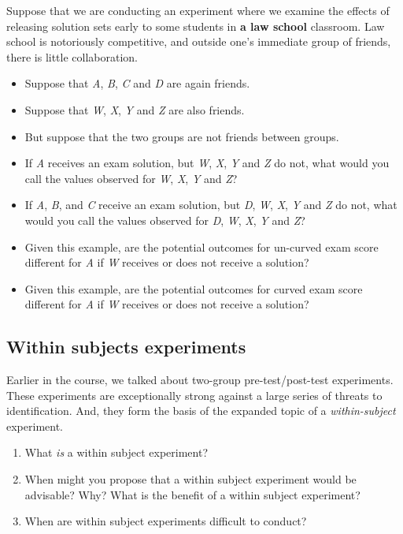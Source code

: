 \documentclass[
]{article}
\providecommand{\tightlist}{%
  \setlength{\itemsep}{0pt}\setlength{\parskip}{0pt}}
\begin{document}
Suppose that we are conducting an experiment where we examine the effects of releasing solution sets early to some students in \textbf{a law school} classroom. Law school is notoriously competitive, and outside one's immediate group of friends, there is little collaboration.

\begin{itemize}
\item
  Suppose that \emph{A}, \emph{B}, \emph{C} and \emph{D} are again friends.
\item
  Suppose that \emph{W}, \emph{X}, \emph{Y} and \emph{Z} are also friends.
\item
  But suppose that the two groups are not friends between groups.
\item
  If \emph{A} receives an exam solution, but \emph{W}, \emph{X}, \emph{Y} and \emph{Z} do not, what would you call the values observed for \emph{W}, \emph{X}, \emph{Y} and \emph{Z}?
\item
  If \emph{A}, \emph{B}, and \emph{C} receive an exam solution, but \emph{D}, \emph{W}, \emph{X}, \emph{Y} and \emph{Z} do not, what would you call the values observed for \emph{D}, \emph{W}, \emph{X}, \emph{Y} and \emph{Z}?
\item
  Given this example, are the potential outcomes for un-curved exam score different for \emph{A} if \emph{W} receives or does not receive a solution?
\item
  Given this example, are the potential outcomes for curved exam score different for \emph{A} if \emph{W} receives or does not receive a solution?
\end{itemize}

\hypertarget{within-subjects-experiments}{%
\subsection{Within subjects experiments}\label{within-subjects-experiments}}

Earlier in the course, we talked about two-group pre-test/post-test experiments. These experiments are exceptionally strong against a large series of threats to identification. And, they form the basis of the expanded topic of a \emph{within-subject} experiment.

\begin{enumerate}
\def\labelenumi{\arabic{enumi}.}
\tightlist
\item
  What \emph{is} a within subject experiment?
\item
  When might you propose that a within subject experiment would be advisable? Why? What is the benefit of a within subject experiment?
\item
  When are within subject experiments difficult to conduct?
\end{enumerate}
\end{document}
